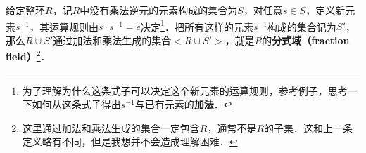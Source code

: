 \begin{definition}{}
给定整环$R$，记$R$中没有乘法逆元的元素构成的集合为$S$，对任意$s\in S$，定义新元素$s^{-1}$，其运算规则由$s\cdot s^{-1}=e$决定\footnote{为了理解为什么这条式子可以决定这个新元素的运算规则，参考例子，思考一下如何从这条式子得出$s^{-1}$与已有元素的\textbf{加法}．}．把所有这样的元素$s^{-1}$构成的集合记为$S'$，那么$R\cup S'$通过加法和乘法生成的集合$<R\cup S'>$，就是$R$的\textbf{分式域（fraction field）}\footnote{这里通过加法和乘法生成的集合一定包含$R$，通常不是$R$的子集．这和上一条定义略有不同，但是我想并不会造成理解困难．}．
\end{definition}

















